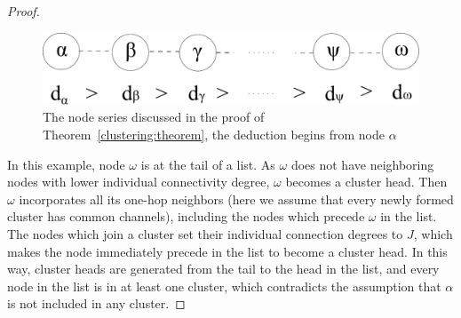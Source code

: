 \documentclass[times]{ettauth}
\theoremstyle{mytheoremstyle}
\theoremstyle{mytheoremstyle}
\theoremstyle{mytheoremstyle}
\begin{document}
\begin{proof}
\begin{figure}[ht!]
  \centering
\includegraphics[width=0.6\linewidth]{lemma1.pdf}
	\caption{The node series discussed in the proof of Theorem~\ref{clustering:theorem}, the deduction begins from node $\alpha$}
	\label{lemma1}
\end{figure}


In this example, node $\omega$ is at the tail of a list.
As $\omega$ does not have neighboring nodes with lower individual connectivity degree, $\omega$ becomes a cluster head.
Then $\omega$ incorporates all its one-hop neighbors (here we assume that every newly formed cluster has common channels), including the nodes which precede $\omega$ in the list.
The nodes which join a cluster set their individual connection degrees to $J$, which makes the node immediately precede in the list to become a cluster head.
In this way, cluster heads are generated from the tail to the head in the list, and every node in the list is in at least one cluster, which contradicts the assumption that $\alpha$ is not included in any cluster.


\end{proof}


%
\end{document}
